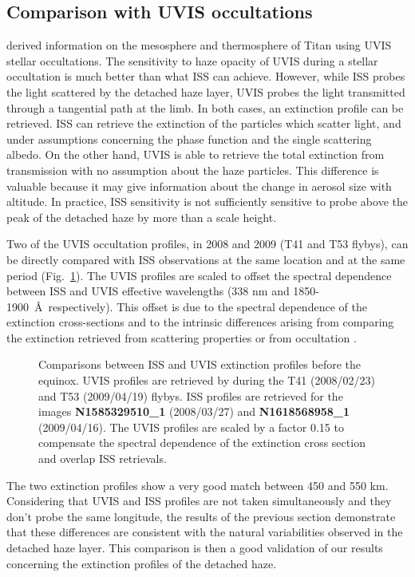 \subsection{Comparison with UVIS occultations}

\cite{Koskinen2011} derived information on the mesosphere and thermosphere of Titan using UVIS stellar
occultations. The sensitivity to haze opacity of UVIS during a stellar occultation is much better than what ISS can achieve. However,
while ISS probes the light scattered by the detached haze layer, UVIS probes the light transmitted through a tangential
path at the limb. In both cases, an extinction profile can be retrieved. ISS can retrieve the extinction of the
particles which scatter light, and under assumptions concerning the phase function and the single scattering albedo.
On the other hand, UVIS is able to retrieve the total extinction from transmission with no assumption about the haze
particles. This difference is valuable because it may give information about the change in aerosol
size with altitude. In practice, ISS sensitivity is not sufficiently sensitive to probe above
the peak of the detached haze by more than a scale height.

Two of the UVIS occultation profiles, in 2008 and 2009 (T41 and T53 flybys), can be directly compared with ISS
observations at the same location and at the same period (Fig.~\ref{fig:uvis_iss}). The UVIS profiles are scaled to
offset the spectral dependence between ISS and UVIS effective wavelengths (338 nm and 1850-1900~\AA~respectively).
This offset is due to the spectral dependence of the extinction cross-sections and to the intrinsic
differences arising from comparing the extinction retrieved from scattering properties or from occultation
\citep[see.][]{Cours2011}.

\begin{figure}[!ht]
\caption{Comparisons between ISS and UVIS extinction profiles before the equinox.
UVIS profiles are retrieved by \cite{Koskinen2011} during the T41 (2008/02/23) and T53 (2009/04/19) flybys.
ISS profiles are retrieved for the images \textbf{N1585329510\_1} (2008/03/27) and
\textbf{N1618568958\_1} (2009/04/16).
The UVIS profiles are scaled by a factor 0.15 to compensate the spectral dependence of the extinction
cross section and overlap ISS retrievals.}
\label{fig:uvis_iss}
\end{figure}

The two extinction profiles show a very good match
between 450 and 550 km. Considering that UVIS and ISS profiles are not taken simultaneously and
they don't probe the same longitude, the results of the previous section demonstrate that these differences are
consistent with the natural variabilities observed in the detached haze layer.
This comparison is then a good validation of our results concerning the extinction profiles of the detached haze.

